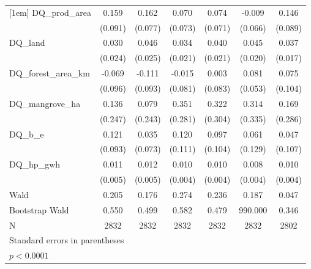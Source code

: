 \begin{table}[htbp]
\begin{tabular}{l*{6}{c}}
[1em]
DQ\_prod\_area&       0.159       &       0.162       &       0.070       &       0.074       &      -0.009       &       0.146       \\
            &     (0.091)       &     (0.077)       &     (0.073)       &     (0.071)       &     (0.066)       &     (0.089)       \\
[1em]
DQ\_land     &       0.030       &       0.046       &       0.034       &       0.040       &       0.045       &       0.037       \\
            &     (0.024)       &     (0.025)       &     (0.021)       &     (0.021)       &     (0.020)       &     (0.017)       \\
[1em]
DQ\_forest\_area\_km&      -0.069       &      -0.111       &      -0.015       &       0.003       &       0.081       &       0.075       \\
            &     (0.096)       &     (0.093)       &     (0.081)       &     (0.083)       &     (0.053)       &     (0.104)       \\
[1em]
DQ\_mangrove\_ha&       0.136       &       0.079       &       0.351       &       0.322       &       0.314       &       0.169       \\
            &     (0.247)       &     (0.243)       &     (0.281)       &     (0.304)       &     (0.335)       &     (0.286)       \\
[1em]
DQ\_b\_e      &       0.121       &       0.035       &       0.120       &       0.097       &       0.061       &       0.047       \\
            &     (0.093)       &     (0.073)       &     (0.111)       &     (0.104)       &     (0.129)       &     (0.107)       \\
[1em]
DQ\_hp\_gwh   &       0.011       &       0.012       &       0.010       &       0.010       &       0.008       &       0.010       \\
            &     (0.005)       &     (0.005)       &     (0.004)       &     (0.004)       &     (0.004)       &     (0.004)       \\
\hline
Wald        &       0.205       &       0.176       &       0.274       &       0.236       &       0.187       &       0.047       \\
Bootstrap Wald&       0.550       &       0.499       &       0.582       &       0.479       &     990.000       &       0.346       \\
N           &        2832       &        2832       &        2832       &        2832       &        2832       &        2802       \\
\hline\hline
\multicolumn{7}{l}{\footnotesize Standard errors in parentheses}\\
\multicolumn{7}{l}{\footnotesize \sym{*} \(p<0.0001\)}\\
\end{tabular}
\end{table}
